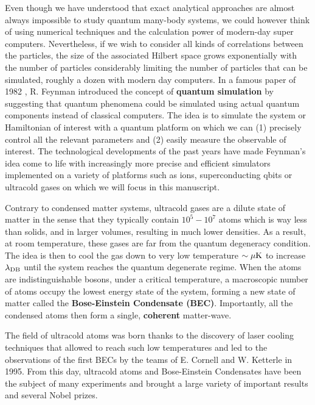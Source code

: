Even though we have understood that exact analytical approaches are almost always impossible to study quantum many-body systems, we could however think of using numerical techniques and the calculation power of modern-day super computers. Nevertheless, if we wish to consider all kinds of correlations between the particles, the size of the associated Hilbert space grows exponentially with the number of particles considerably limiting the number of particles that can be simulated, roughly a dozen with modern day computers. In a famous paper of 1982 \cite{Feynman1982Simulating}, R. Feynman introduced the concept of \textbf{quantum simulation} by suggesting that quantum phenomena could be simulated using actual quantum components instead of classical computers. The idea is to simulate the system or Hamiltonian of interest with a quantum platform on which we can (1) precisely control all the relevant parameters and (2) easily measure the observable of interest. The technological developments of the past years have made Feynman's idea come to life with increasingly more precise and efficient simulators implemented on a variety of platforms such as ions, superconducting qbits or ultracold gases on which we will focus in this manuscript. 

Contrary to condensed matter systems, ultracold gases are a dilute state of matter in the sense that they typically contain $10^5-10^7$ atoms which is way less than solids, and in larger volumes, resulting in much lower densities. As a result, at room temperature, these gases are far from the quantum degeneracy condition. The idea is then to cool the gas down to very low temperature $\sim \mu \rm{K}$ to increase $\lambda_{\rm{DB}}$ until the system reaches the quantum degenerate regime. When the atoms are indistinguishable  bosons, under a critical temperature, a macroscopic number of atoms occupy the lowest energy state of the system, forming a new state of matter called the \textbf{Bose-Einstein Condensate (BEC)}. Importantly, all the condensed atoms then form a single, \textbf{coherent} matter-wave. 

The field of ultracold atoms was born thanks to the discovery of laser cooling techniques \cite{chu1985three,dalibard1989laser,phillips1982laser} that allowed to reach such low temperatures and led to the observations of the first BECs by the teams of E. Cornell \cite{anderson1995observation} and W. Ketterle \cite{davis1995bose} in 1995. From this day, ultracold atoms and Bose-Einstein Condensates have been the subject of many experiments and brought a large variety of important results and several Nobel prizes.

